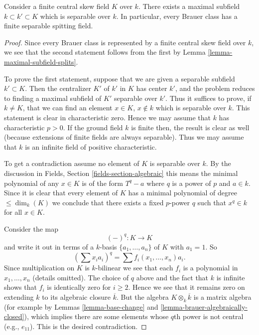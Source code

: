\begin{proposition}
\label{proposition-separable-splitting-field}
Consider a finite central skew field $K$ over $k$.
There exists a maximal subfield $k \subset k' \subset K$ which
is separable over $k$.
In particular, every Brauer class has a finite separable
spitting field.
\end{proposition}

\begin{proof}
Since every Brauer class is represented by a finite central skew
field over $k$, we see that the second statement follows from the
first by
Lemma \ref{lemma-maximal-subfield-splits}.

\medskip\noindent
To prove the first statement, suppose that we are given a separable
subfield $k' \subset K$. Then the centralizer $K'$ of $k'$ in $K$
has center $k'$, and the problem reduces to finding a maximal
subfield of $K'$ separable over $k'$. Thus it suffices to prove, if
$k \not = K$, that we can find an element $x \in K$, $x \not \in k$
which is separable over $k$. This statement is clear in characteristic
zero. Hence we may assume that $k$ has characteristic $p > 0$. If the
ground field $k$ is finite then, the result is clear as well (because
extensions of finite fields are always separable). Thus we may assume
that $k$ is an infinite field of positive characteristic.

\medskip\noindent
To get a contradiction assume no element of $K$ is separable over $k$.
By the discussion in
Fields, Section \ref{fields-section-algebraic}
this means the minimal polynomial of any $x \in K$ is of the form
$T^q - a$ where $q$ is a power of $p$ and $a \in k$. Since it is
clear that every element of $K$ has a minimal polynomial of degree
$\leq \dim_k(K)$ we conclude that there exists a fixed $p$-power
$q$ such that $x^q \in k$ for all $x \in K$.

\medskip\noindent
Consider the map
$$
(-)^q : K \longrightarrow K
$$
and write it out in terms of a $k$-basis $\{a_1, \ldots, a_n\}$ of $K$
with $a_1 = 1$. So
$$
(\sum x_i a_i)^q = \sum f_i(x_1, \ldots, x_n)a_i.
$$
Since multiplication on $K$ is $k$-bilinear we see that each $f_i$
is a polynomial in $x_1, \ldots, x_n$ (details omitted).
The choice of $q$ above and the fact that $k$ is infinite shows that
$f_i$ is identically zero for $i \geq 2$. Hence we see that it remains
zero on extending $k$ to its algebraic closure $\overline{k}$. But the
algebra $K \otimes_k \overline{k}$ is a matrix algebra (for example by
Lemmas \ref{lemma-base-change} and \ref{lemma-brauer-algebraically-closed}),
which implies there are some elements whose $q$th power is not central
(e.g., $e_{11}$). This is the desired contradiction.
\end{proof}

